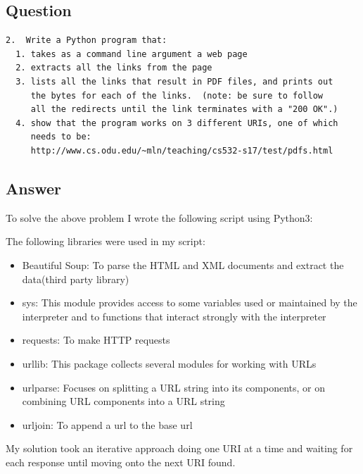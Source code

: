 \documentclass[letterpaper,12pt]{article}
\begin{document}
\subsection*{Question}

\begin{verbatim}
2.  Write a Python program that:
  1. takes as a command line argument a web page
  2. extracts all the links from the page
  3. lists all the links that result in PDF files, and prints out
     the bytes for each of the links.  (note: be sure to follow
     all the redirects until the link terminates with a "200 OK".)
  4. show that the program works on 3 different URIs, one of which
     needs to be: 
     http://www.cs.odu.edu/~mln/teaching/cs532-s17/test/pdfs.html
\end{verbatim}

\subsection*{Answer}

To solve the above problem I wrote the following script using Python3:




The following libraries were used in my script:

\begin{itemize}
  \item Beautiful Soup: To parse the HTML and XML documents and extract the data(third party library)
  \item sys: This module provides access to some variables used or maintained by the interpreter and to functions that interact strongly with the interpreter
  \item requests: To make HTTP requests
  \item urllib: This package collects several modules for working with URLs
  \item urlparse: Focuses on splitting a URL string into its components, or on combining URL components into a URL string
  \item urljoin: To append a url to the base url
\end{itemize}

My solution took an iterative approach doing one URI at a time and waiting for each response until moving onto the next URI found.
\end{document}
